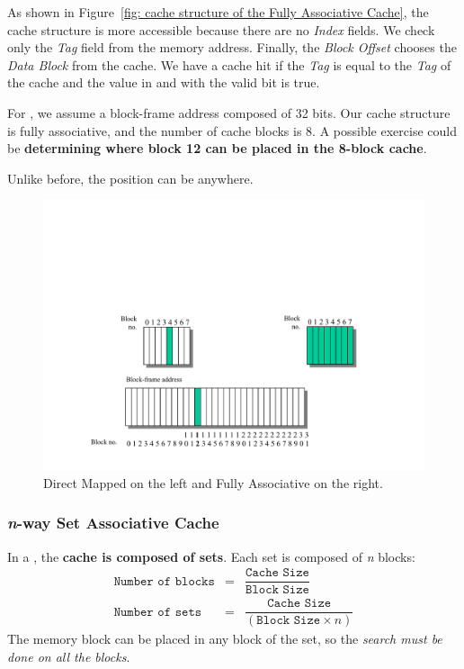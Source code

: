 \noindent
As shown in Figure~\ref{fig: cache structure of the Fully Associative Cache}, the cache structure is more accessible because there are no \emph{Index} fields. We check only the \emph{Tag} field from the memory address. Finally, the \emph{Block Offset} chooses the \emph{Data Block} from the cache. We have a cache hit if the \emph{Tag} is equal to the \emph{Tag} of the cache and the value in and with the valid bit is true.

\newpage

\noindent
For , we assume a block-frame address composed of 32 bits. Our cache structure is fully associative, and the number of cache blocks is 8. A possible exercise could be \textbf{determining where block 12 can be placed in the 8-block cache}.

\highspace
Unlike before, the position can be anywhere.

\begin{figure}[!htp]
    \centering
    \includegraphics[width=.8\textwidth]{img/fully-associative-cache-3.pdf}
    \caption*{Direct Mapped on the left and Fully Associative on the right.}
\end{figure}

\newpage

\label{n-way Set Associative Cache}
\hypertarget{n-way Set Associative Cache}{\subsubsection*{\textcolor{Red2}{\emph{n}-way Set Associative Cache}}}

In a , the \textbf{cache is composed of sets}. Each set is composed of \emph{n} blocks:
\begin{equation}
    \begin{array}{rcl}
        \texttt{Number of blocks} &=& \dfrac{\texttt{Cache Size}}{\texttt{Block Size}} \\ [1.5em]
        \texttt{Number of sets} &=& \dfrac{\texttt{Cache Size}}{\left(\texttt{Block Size} \times n\right)}
    \end{array}
\end{equation}
The memory block can be placed in any block of the set, so the \emph{search must be done on all the blocks}.

